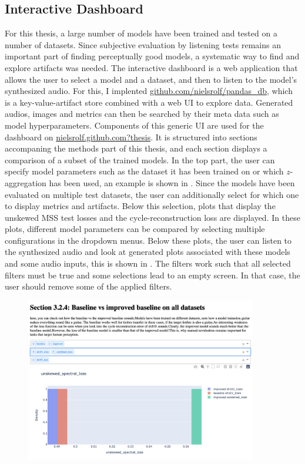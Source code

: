 \begin{theappendices}
    \chapter{Interactive Dashboard}
    \label{interactivedashboard}
    For this thesis, a large number of models have been trained and tested on a number of datasets.
    Since subjective evaluation by listening tests remains an important part of finding perceptually good models, a systematic way to find and explore artifacts was needed.
    The interactive dashboard is a web application that allows the user to select a model and a dataset, and then to listen to the model's synthesized audio.
    For this, I implented \href{https://github.com/nielsrolf/pandas\_db}{github.com/nielsrolf/pandas\_db}, which is a key-value-artifact store combined with a web UI to explore data.
    Generated audios, images and metrics can then be searched by their meta data such as model hyperparameters.
    Components of this generic UI are used for the dashboard on \href{https://nielsrolf.github.com?thesis}{nielsrolf.github.com?thesis}.\newline
    It is structured into sections accompaning the methods part of this thesis, and each section displays a comparison of a subset of the trained models.
    In the top part, the user can specify model parameters such as the dataset it has been trained on or which $z$-aggregation has been used, an example is shown in . Since the models have been evaluated on multiple test datasets, the user can additionally select for which one to display metrics and artifacts. \newline
    Below this selection, plots that display the unskewed MSS test losses  and the cycle-reconstruction loss are displayed. In these plots, different model parameters can be compared by selecting multiple configurations in the dropdown menus. \newline
    Below these plots, the user can listen to the synthesized audio and look at generated plots associated with these models and some audio inputs, this is shown in .
    The filters work such that all selected filters must be true and some selections lead to an empty screen. In that case, the user should remove some of the applied filters. \newline
    \begin{figure}
        \includegraphics[width=0.9\textwidth]{figures/dashboard/screen1.png}

\end{figure}
\end{theappendices}
